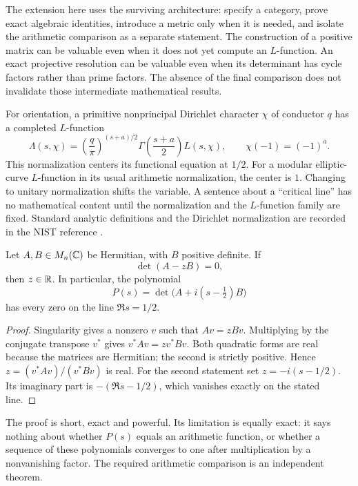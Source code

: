 The extension here uses the surviving architecture: specify a category, prove exact algebraic identities, introduce a metric only when it is needed, and isolate the arithmetic comparison as a separate statement. The construction of a positive matrix can be valuable even when it does not yet compute an $L$-function. An exact projective resolution can be valuable even when its determinant has cycle factors rather than prime factors. The absence of the final comparison does not invalidate those intermediate mathematical results.

For orientation, a primitive nonprincipal Dirichlet character $\chi$ of conductor $q$ has a completed $L$-function
\[
 \Lambda(s,\chi)=\left(\frac q\pi\right)^{(s+a)/2}
 \Gamma\left(\frac{s+a}{2}\right)L(s,\chi),
 \qquad \chi(-1)=(-1)^a.
\]
This normalization centers its functional equation at $1/2$. For a modular elliptic-curve $L$-function in its usual arithmetic normalization, the center is $1$. Changing to unitary normalization shifts the variable. A sentence about a ``critical line'' has no mathematical content until the normalization and the $L$-function family are fixed. Standard analytic definitions and the Dirichlet normalization are recorded in the NIST reference \cite{DLMFL}.

\begin{proposition}
Let $A,B\in M_n(\mathbb{C})$ be Hermitian, with $B$ positive definite. If
\[
 \det(A-zB)=0,
\]
then $z\in\mathbb{R}$. In particular, the polynomial
\[
 P(s)=\det\bigl(A+i(s-\tfrac12)B\bigr)
\]
has every zero on the line $\Re s=1/2$.
\end{proposition}
\begin{proof}
Singularity gives a nonzero $v$ such that $Av=zBv$. Multiplying by the conjugate transpose $v^*$ gives
$v^*Av=zv^*Bv$. Both quadratic forms are real because the matrices are Hermitian; the second is strictly positive. Hence
$z=(v^*Av)/(v^*Bv)$ is real. For the second statement set
$z=-i(s-1/2)$. Its imaginary part is $-(\Re s-1/2)$, which vanishes exactly on the stated line.
\end{proof}

The proof is short, exact and powerful. Its limitation is equally exact: it says nothing about whether $P(s)$ equals an arithmetic function, or whether a sequence of these polynomials converges to one after multiplication by a nonvanishing factor. The required arithmetic comparison is an independent theorem.

